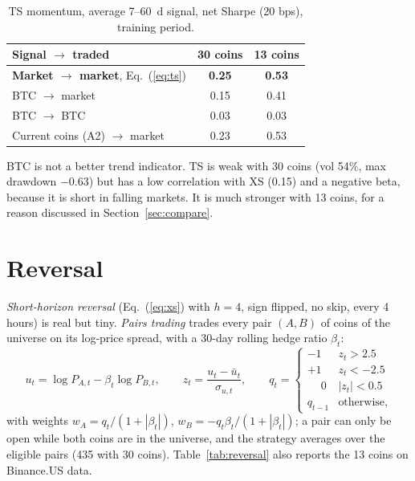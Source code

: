 \documentclass[aps,prl,onecolumn,superscriptaddress,nofootinbib]{revtex4-2}
\begin{document}
	\begin{table}[!htbp]
		\caption{TS momentum, average 7--60~d signal, net Sharpe (20 bps), training period.}
		\label{tab:ts}
		\begin{ruledtabular}
			\begin{tabular}{lcc}
				Signal $\to$ traded & 30 coins & 13 coins \\
				\hline
				\textbf{Market $\to$ market}, Eq.~(\ref{eq:ts}) & \textbf{0.25} & \textbf{0.53} \\
				BTC $\to$ market          & 0.15 & 0.41 \\
				BTC $\to$ BTC             & 0.03 & 0.03 \\
				Current coins (A2) $\to$ market & 0.23 & 0.53 \\
			\end{tabular}
		\end{ruledtabular}
	\end{table}

	BTC is not a better trend indicator. TS is weak with 30 coins (vol 54\%, max drawdown $-0.63$) but has a low correlation with XS (0.15) and a negative beta, because it is short in falling markets. It is much stronger with 13 coins, for a reason discussed in Section~\ref{sec:compare}.

	\section{Reversal}
	\label{sec:reversal}

	\textit{Short-horizon reversal} (Eq.~(\ref{eq:xs}) with $h = 4$, sign flipped, no skip, every 4 hours) is real but tiny. \textit{Pairs trading} trades every pair $(A, B)$ of coins of the universe on its log-price spread, with a 30-day rolling hedge ratio $\beta_t$:
	\begin{equation}
		u_t = \log P_{A,t} - \beta_t \log P_{B,t}, \qquad
		z_t = \frac{u_t - \bar u_t}{\sigma_{u,t}}, \qquad
		q_t =
		\begin{cases}
			-1 & z_t > 2.5 \\
			+1 & z_t < -2.5 \\
			\phantom{+}0 & |z_t| < 0.5 \\
			q_{t-1} & \text{otherwise,}
		\end{cases}
		\label{eq:pairs}
	\end{equation}
	with weights $w_A = q_t/(1+|\beta_t|)$, $w_B = -q_t\beta_t/(1+|\beta_t|)$; a pair can only be open while both coins are in the universe, and the strategy averages over the eligible pairs (435 with 30 coins). Table~\ref{tab:reversal} also reports the 13 coins on Binance.US data.
\end{document}
